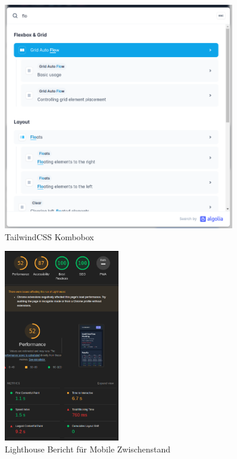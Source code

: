 \begin{figure}[th]
    \centering
    \includegraphics[width=0.9\textwidth]{Figures/cmdk_tailwindcss.png}
    \decoRule
    \caption[TailwindCSS Kombobox]{TailwindCSS Kombobox}
    \label{fig:cmdk_tailwindcss}
\end{figure}

\begin{figure}[th]
    \centering
    \includegraphics[width=0.45\textwidth]{Figures/lighthouse_mobile_1.png}
    \decoRule
    \caption[Turbomeet Lighthouse Bericht Mobile]{Lighthouse Bericht für Mobile Zwischenstand}
    \label{fig:lighthouse_mobile_1}
\end{figure}